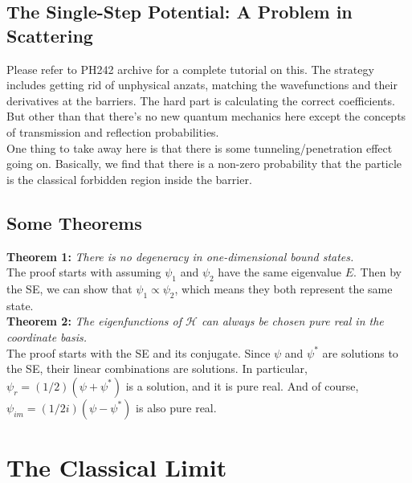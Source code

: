 \documentclass{book}
\theoremstyle{definition}
\newcommand{\ham}{\mathcal{H}}
\newcommand{\lp}{\left(}
\newcommand{\rp}{\right)}
\begin{document}
\subsection{The Single-Step Potential: A Problem in Scattering}

Please refer to PH242 archive for a complete tutorial on this. The strategy includes getting rid of unphysical anzats, matching the wavefunctions and their derivatives at the barriers. The hard part is calculating the correct coefficients. But other than that there's no new quantum mechanics here except the concepts of transmission and reflection probabilities. \\

One thing to take away here is that there is some tunneling/penetration effect going on. Basically, we find that there is a non-zero probability that the particle is the classical forbidden region inside the barrier.



\subsection{Some Theorems}

\textbf{Theorem 1:} \textit{There is no degeneracy in one-dimensional bound states.}\\

The proof starts with assuming $\psi_1$ and $\psi_2$ have the same eigenvalue $E$. Then by the SE, we can show that $\psi_1 \propto \psi_2$, which means they both represent the same state. \\

\textbf{Theorem 2:} \textit{The eigenfunctions of $\ham$ can always be chosen pure real in the coordinate basis.}\\

The proof starts with the SE and its conjugate. Since $\psi$ and $\psi^*$ are solutions to the SE, their linear combinations are solutions. In particular, $\psi_r = (1/2)\lp \psi + \psi^* \rp$ is a solution, and it is pure real. And of course, $\psi_{im} = (1/2i)\lp \psi - \psi^*\rp$ is also pure real. 






\newpage



\section{The Classical Limit}
\end{document}
